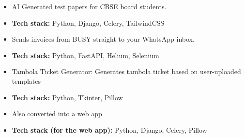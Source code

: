 \documentclass[10pt,a4paper,withhyper]{altacv}
\begin{document}
\begin{paracol}{2}





\begin{itemize}
\item AI Generated test papers for CBSE board students.
\item \textbf{Tech stack:} Python, Django, Celery, TailwindCSS
\end{itemize}

\divider

\begin{itemize}
  \item Sends invoices from BUSY straight to your WhatsApp inbox.
  \item \textbf{Tech stack:} Python, FastAPI, Helium, Selenium
\end{itemize}

\divider

\begin{itemize}
\item Tambola Ticket Generator: Generates tambola ticket based on user-uploaded templates
\item \textbf{Tech stack:} Python, Tkinter, Pillow
\item Also converted into a web app
\item \textbf{Tech stack (for the web app):} Python, Django, Celery, Pillow
\end{itemize}


\end{paracol}
\end{document}
